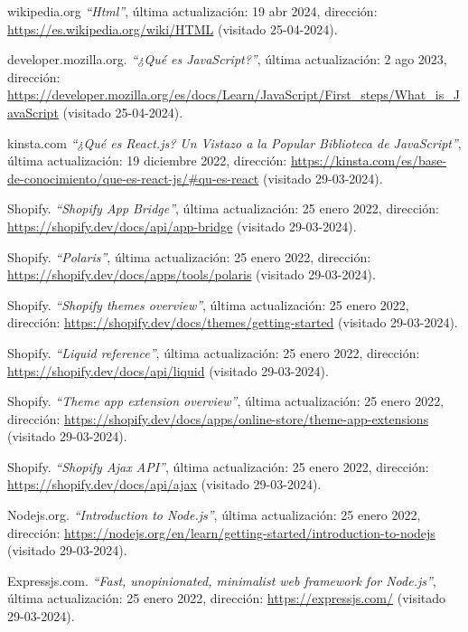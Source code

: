 \documentclass[12pt]{article}
\begin{document}
\begin{thebibliography}{100}
    wikipedia.org
    \textit{``Html''}, última actualización: 19 abr 2024, dirección: \url{https://es.wikipedia.org/wiki/HTML} (visitado 25-04-2024).

    developer.mozilla.org.
    \textit{``¿Qué es JavaScript?''}, última actualización: 2 ago 2023, dirección: \url{https://developer.mozilla.org/es/docs/Learn/JavaScript/First_steps/What_is_JavaScript} (visitado 25-04-2024).

    kinsta.com
    \textit{``¿Qué es React.js? Un Vistazo a la Popular Biblioteca de JavaScript''}, última actualización: 19 diciembre 2022, dirección: \url{https://kinsta.com/es/base-de-conocimiento/que-es-react-js/#qu-es-react} (visitado 29-03-2024).

    Shopify.
    \textit{``Shopify App Bridge''}, última actualización: 25 enero 2022, dirección: \url{https://shopify.dev/docs/api/app-bridge} (visitado 29-03-2024).

    Shopify.
    \textit{``Polaris''}, última actualización: 25 enero 2022, dirección: \url{https://shopify.dev/docs/apps/tools/polaris} (visitado 29-03-2024).

    Shopify.
    \textit{``Shopify themes overview''}, última actualización: 25 enero 2022, dirección: \url{https://shopify.dev/docs/themes/getting-started} (visitado 29-03-2024).

    Shopify.
    \textit{``Liquid reference''}, última actualización: 25 enero 2022, dirección: \url{https://shopify.dev/docs/api/liquid} (visitado 29-03-2024).

    Shopify.
    \textit{``Theme app extension overview''}, última actualización: 25 enero 2022, dirección: \url{https://shopify.dev/docs/apps/online-store/theme-app-extensions} (visitado 29-03-2024).

    Shopify.
    \textit{``Shopify Ajax API''}, última actualización: 25 enero 2022, dirección: \url{https://shopify.dev/docs/api/ajax} (visitado 29-03-2024).

    Nodejs.org.
    \textit{``Introduction to Node.js''}, última actualización: 25 enero 2022, dirección: \url{https://nodejs.org/en/learn/getting-started/introduction-to-nodejs} (visitado 29-03-2024).

    Expressjs.com.
    \textit{``Fast, unopinionated, minimalist web framework for Node.js''}, última actualización: 25 enero 2022, dirección: \url{https://expressjs.com/} (visitado 29-03-2024).


\end{thebibliography}
\end{document}
